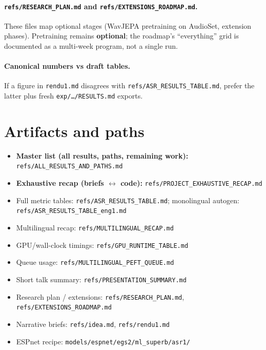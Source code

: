 \documentclass[11pt,a4paper]{article}
\begin{document}
\paragraph{\texttt{refs/RESEARCH\_PLAN.md} and \texttt{refs/EXTENSIONS\_ROADMAP.md}.}
These files map optional stages (WavJEPA pretraining on AudioSet, extension phases). Pretraining remains \textbf{optional}; the roadmap's ``everything'' grid is documented as a multi-week program, not a single run.

\paragraph{Canonical numbers vs draft tables.}
If a figure in \texttt{rendu1.md} disagrees with \texttt{refs/ASR\_RESULTS\_TABLE.md}, prefer the latter plus fresh \texttt{exp/\dots/RESULTS.md} exports.

\section{Artifacts and paths}
\begin{itemize}[leftmargin=*]
    \item \textbf{Master list (all results, paths, remaining work):} \texttt{refs/ALL\_RESULTS\_AND\_PATHS.md}
    \item \textbf{Exhaustive recap (briefs $\leftrightarrow$ code):} \texttt{refs/PROJECT\_EXHAUSTIVE\_RECAP.md}
    \item Full metric tables: \texttt{refs/ASR\_RESULTS\_TABLE.md}; monolingual autogen: \texttt{refs/ASR\_RESULTS\_TABLE\_eng1.md}
    \item Multilingual recap: \texttt{refs/MULTILINGUAL\_RECAP.md}
    \item GPU/wall-clock timings: \texttt{refs/GPU\_RUNTIME\_TABLE.md}
    \item Queue usage: \texttt{refs/MULTILINGUAL\_PEFT\_QUEUE.md}
    \item Short talk summary: \texttt{refs/PRESENTATION\_SUMMARY.md}
    \item Research plan / extensions: \texttt{refs/RESEARCH\_PLAN.md}, \texttt{refs/EXTENSIONS\_ROADMAP.md}
    \item Narrative briefs: \texttt{refs/idea.md}, \texttt{refs/rendu1.md}
    \item ESPnet recipe: \texttt{models/espnet/egs2/ml\_superb/asr1/}
\end{itemize}
\end{document}
